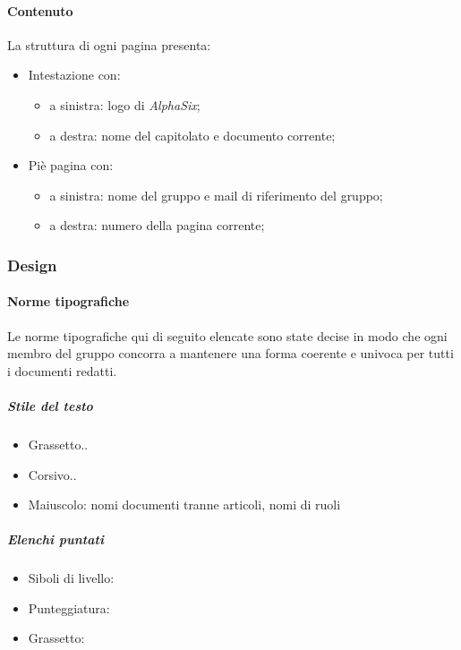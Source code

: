 			\paragraph{Contenuto}\label{PS:Documentazione:Struttura:Contenuto}
			La struttura di ogni pagina presenta:
			\begin{itemize}
				\item Intestazione con:
				\begin{itemize}
					\item a sinistra: logo di \textit{AlphaSix};
					\item a destra: nome del capitolato e documento corrente;
				\end{itemize}
				 \item Piè pagina con:
				 \begin{itemize}
				 	\item a sinistra: nome del gruppo e mail di riferimento del gruppo;
				 	\item a destra: numero della pagina corrente;
				\end{itemize}
			\end{itemize}


		\subsubsection{Design}\label{PS:Documentazione:Design}

			\paragraph{Norme tipografiche}\label{PS:Documentazione:Design:NormeT}
			Le norme tipografiche qui di seguito elencate sono state decise in modo che ogni membro del gruppo concorra a mantenere una forma coerente e univoca per tutti i documenti redatti.

			\subparagraph{Stile del testo}\label{PS:Documentazione:Design:NormeT:StileTesto}
			\begin{itemize}
				\item Grassetto..
				\item Corsivo..
				\item Maiuscolo: nomi documenti tranne articoli, nomi di ruoli
			\end{itemize}

			\subparagraph{Elenchi puntati}\label{PS:Documentazione:Design:NormeT:ElenchiPuntati}
			\begin{itemize}
				\item Siboli di livello:
				\item Punteggiatura:
				\item Grassetto:
			\end{itemize}


